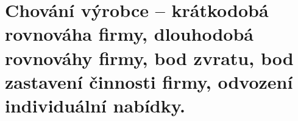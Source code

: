 \clearpage
\section{Chování výrobce – krátkodobá rovnováha firmy, dlouhodobá rovnováhy firmy, bod
zvratu, bod zastavení činnosti firmy, odvození individuální nabídky.}